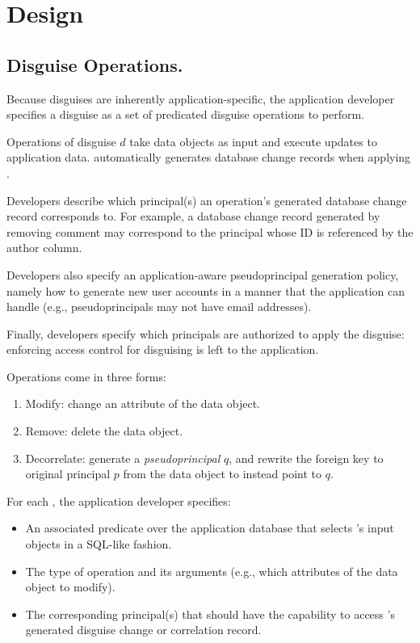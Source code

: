 \section{Design} 
\subsection{Disguise Operations.} 
Because disguises are inherently application-specific, the application developer 
specifies a disguise as a 
set of predicated disguise operations  to perform.

Operations  of disguise $d$ take data objects as input and execute updates to application
data.  \sys automatically generates database change records when applying . 

Developers describe which principal(s) an operation's generated database change record corresponds
to. For example, a database change record generated by removing comment may correspond to the
principal whose ID is referenced by the author column.  

Developers also specify an application-aware pseudoprincipal generation policy, namely how to
generate new user accounts in a manner that the application can handle (e.g., pseudoprincipals may
not have email addresses).

Finally, developers specify which principals are authorized to apply the disguise: enforcing access
control for disguising is left to the application.  

\vspace{6pt}\noindent
Operations come in three forms:
\begin{enumerate}
    \item Modify: change an attribute of the data object.
    \item Remove: delete the data object.
    \item Decorrelate: generate a \emph{pseudoprincipal} $q$, and rewrite the foreign key to original
        principal $p$ from the data object to instead point to $q$.  
\end{enumerate}

\noindent For each , the application developer specifies:
\begin{itemize}
    \item An associated predicate over the application database that selects 's input
        objects in a SQL-like fashion.
    \item The type of operation and its arguments (e.g., which attributes of the data object to
        modify).
    \item The corresponding principal(s) that should have the capability to access 's
        generated disguise change or correlation record.
\end{itemize}


